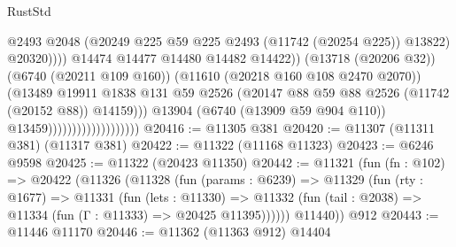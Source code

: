 \begin{lexlean}{RustStd}
\begin{coremodule}
                                                        @2493
                                                        @2048
                                                        (@20249
                                                          @225
                                                          @59
                                                          @225
                                                          @2493
                                                          (@11742 (@20254 @225))
                                                          @13822)
                                                        @20320))))
                                                @14474
                                                @14477
                                                @14480
                                                @14482
                                                @14422))
                                            (@13718 (@20206 @32))
                                            (@6740 (@20211 @109 @160))
                                            (@11610 (@20218 @160 @108 @2470 @2070))
                                            (@13489
                                              @19911
                                              @1838
                                              @131
                                              @59
                                              @2526
                                              (@20147
                                                @88
                                                @59
                                                @88
                                                @2526
                                                (@11742 (@20152 @88))
                                                @14159)))
                                          @13904
                                          (@6740 (@13909 @59 @904 @110))
                                          @13459)))))))))))))))))))
@20416 := @11305 @381
@20420 := @11307 (@11311 @381) (@11317 @381)
@20422 := @11322 (@11168 @11323)
@20423 := @6246 @9598
@20425 := @11322 (@20423 @11350)
@20442 := @11321
    (fun (fn : @102) =>
    @20422
      (@11326
        (@11328
          (fun (params : @6239) =>
          @11329
            (fun (rty : @1677) =>
            @11331
              (fun (lets : @11330) =>
              @11332 (fun (tail : @2038) => @11334 (fun (Γ : @11333) => @20425 @11395))))))
        @11440))
    @912
@20443 := @11446 @11170
@20446 := @11362 (@11363 @912) @14404

\end{coremodule}
\end{lexlean}
